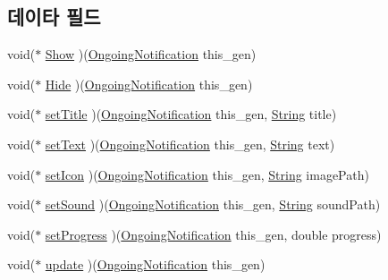 \subsection*{데이타 필드}
\begin{DoxyCompactItemize}
\item 
void($\ast$ \hyperlink{struct___ongoing_notification_af3f0ea7c9764813a55482dae3bcf5037}{Show} )(\hyperlink{_ongoing_notification_8h_a5e36b6a63a0cd1507baf647736b76ac4}{Ongoing\-Notification} this\-\_\-gen)
\item 
void($\ast$ \hyperlink{struct___ongoing_notification_afdc0b8cac867cd63e7160f849629b7d2}{Hide} )(\hyperlink{_ongoing_notification_8h_a5e36b6a63a0cd1507baf647736b76ac4}{Ongoing\-Notification} this\-\_\-gen)
\item 
void($\ast$ \hyperlink{struct___ongoing_notification_a1603dddb1e9306dd04f416ec71e353b7}{set\-Title} )(\hyperlink{_ongoing_notification_8h_a5e36b6a63a0cd1507baf647736b76ac4}{Ongoing\-Notification} this\-\_\-gen, \hyperlink{dit_8h_a2efe6d463d80744789f228f5dc4baa39}{String} title)
\item 
void($\ast$ \hyperlink{struct___ongoing_notification_a00acfb78dfd3520407a0da33290f67b6}{set\-Text} )(\hyperlink{_ongoing_notification_8h_a5e36b6a63a0cd1507baf647736b76ac4}{Ongoing\-Notification} this\-\_\-gen, \hyperlink{dit_8h_a2efe6d463d80744789f228f5dc4baa39}{String} text)
\item 
void($\ast$ \hyperlink{struct___ongoing_notification_a2df14bd8a05050bcf5225169cbaf94d4}{set\-Icon} )(\hyperlink{_ongoing_notification_8h_a5e36b6a63a0cd1507baf647736b76ac4}{Ongoing\-Notification} this\-\_\-gen, \hyperlink{dit_8h_a2efe6d463d80744789f228f5dc4baa39}{String} image\-Path)
\item 
void($\ast$ \hyperlink{struct___ongoing_notification_aa822ce12ab238447d07f6821629dfaaf}{set\-Sound} )(\hyperlink{_ongoing_notification_8h_a5e36b6a63a0cd1507baf647736b76ac4}{Ongoing\-Notification} this\-\_\-gen, \hyperlink{dit_8h_a2efe6d463d80744789f228f5dc4baa39}{String} sound\-Path)
\item 
void($\ast$ \hyperlink{struct___ongoing_notification_afddc1bda00e4242433a486881aed226c}{set\-Progress} )(\hyperlink{_ongoing_notification_8h_a5e36b6a63a0cd1507baf647736b76ac4}{Ongoing\-Notification} this\-\_\-gen, double progress)
\item 
void($\ast$ \hyperlink{struct___ongoing_notification_ae5eaf248602ec0edb1334d47d959f0e9}{update} )(\hyperlink{_ongoing_notification_8h_a5e36b6a63a0cd1507baf647736b76ac4}{Ongoing\-Notification} this\-\_\-gen)
\end{DoxyCompactItemize}


